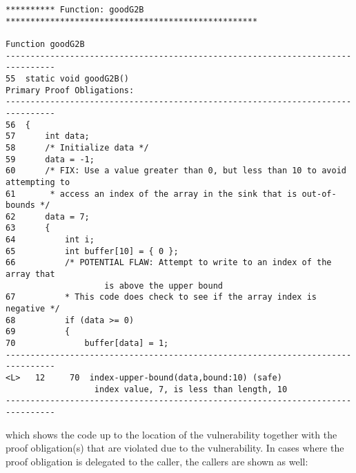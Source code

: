 \documentclass[11pt]{article}
\begin{document}
\begin{scriptsize}
\begin{verbatim}
********** Function: goodG2B ***************************************************

Function goodG2B
--------------------------------------------------------------------------------
55  static void goodG2B()
Primary Proof Obligations:
--------------------------------------------------------------------------------
56  {
57      int data;
58      /* Initialize data */
59      data = -1;
60      /* FIX: Use a value greater than 0, but less than 10 to avoid attempting to
61       * access an index of the array in the sink that is out-of-bounds */
62      data = 7;
63      {
64          int i;
65          int buffer[10] = { 0 };
66          /* POTENTIAL FLAW: Attempt to write to an index of the array that 
                    is above the upper bound
67          * This code does check to see if the array index is negative */
68          if (data >= 0)
69          {
70              buffer[data] = 1;
--------------------------------------------------------------------------------
<L>   12     70  index-upper-bound(data,bound:10) (safe)
                  index value, 7, is less than length, 10
--------------------------------------------------------------------------------
\end{verbatim}
\end{scriptsize}

which shows the code up to the location of the vulnerability together with the
proof obligation(s) that are violated due to the vulnerability. In cases where
the proof obligation is delegated to the caller, the callers are shown as well:
\end{document}
